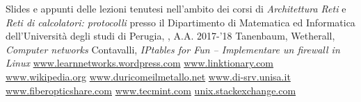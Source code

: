 \documentclass[a4paper, twoside]{article}
\begin{document}
\begin{thebibliography}{9}
	
	Slides e appunti delle lezioni tenutesi nell'ambito dei corsi di \textit{Architettura Reti} e \textit{Reti di calcolatori: protocolli} presso il Dipartimento di Matematica ed Informatica dell'Università degli studi di Perugia, , 
	A.A. 2017-'18
	Tanenbaum, Wetherall, 
	\textit{Computer networks}
	Contavalli, 
	\textit{IPtables for Fun – Implementare un firewall in Linux}
	\url{www.learnnetworks.wordpress.com}
	\url{www.linktionary.com}
	\url{www.wikipedia.org}
	\url{www.duricomeilmetallo.net}
	\url{www.di-srv.unisa.it}
	\url{www.fiberopticshare.com}
	\url{www.tecmint.com}
	\url{unix.stackexchange.com}
\end{thebibliography}
\end{document}
